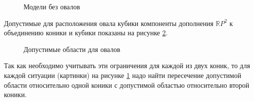 \documentclass[14pt]{article}
\begin{document}
\begin{figure}[H]
\caption{Модели без овалов}
\label{fig:curves_without_ovals}
\end{figure}
Допустимые для расположения овала кубики компоненты дополнения $\mathbb RP^2$ к объединению коники и кубики показаны на рисунке \ref{fig:ovals_and_loc_of_odd_brunch}.

\begin{figure}[H]
\caption{Допустимые области для овалов}
\label{fig:ovals_and_loc_of_odd_brunch}
\end{figure}

Так как необходимо учитывать эти ограничения для каждой из двух коник, то для каждой ситуации (картинки) на рисунке \ref{fig:curves_without_ovals} надо найти пересечение допустимой области относительно одной коники с допустимой областью относительно второй коники.
\end{document}
